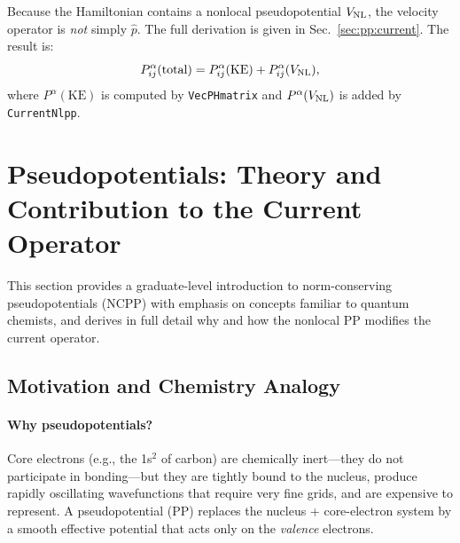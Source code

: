 \documentclass[12pt,letterpaper]{article}
\newcommand{\VNL}{V_{\rm NL}}
\begin{document}
Because the Hamiltonian contains a nonlocal pseudopotential $\VNL$, the velocity
operator is \emph{not} simply $\hat{p}$.  The full derivation is given in
Sec.~\ref{sec:pp:current}.  The result is:
\begin{equation}
  P^\alpha_{ij}(\text{total}) = P^\alpha_{ij}(\text{KE}) + P^\alpha_{ij}(\VNL),
  \label{eq:Ptotal}
\end{equation}
where $P^\alpha(\text{KE})$ is computed by \texttt{VecPHmatrix} and
$P^\alpha(\VNL)$ is added by \texttt{CurrentNlpp}.

\section{Pseudopotentials: Theory and Contribution to the Current Operator}
\label{sec:pp}

This section provides a graduate-level introduction to norm-conserving
pseudopotentials (NCPP) with emphasis on concepts familiar to quantum chemists,
and derives in full detail why and how the nonlocal PP modifies the current
operator.

\subsection{Motivation and Chemistry Analogy}
\label{sec:pp:motivation}

\paragraph{Why pseudopotentials?}
Core electrons (e.g., the 1s$^2$ of carbon) are chemically inert---they do
not participate in bonding---but they are tightly bound to the nucleus, produce
rapidly oscillating wavefunctions that require very fine grids, and are
expensive to represent.  A pseudopotential (PP) replaces the nucleus +
core-electron system by a smooth effective potential that acts only on the
\emph{valence} electrons.
\end{document}
